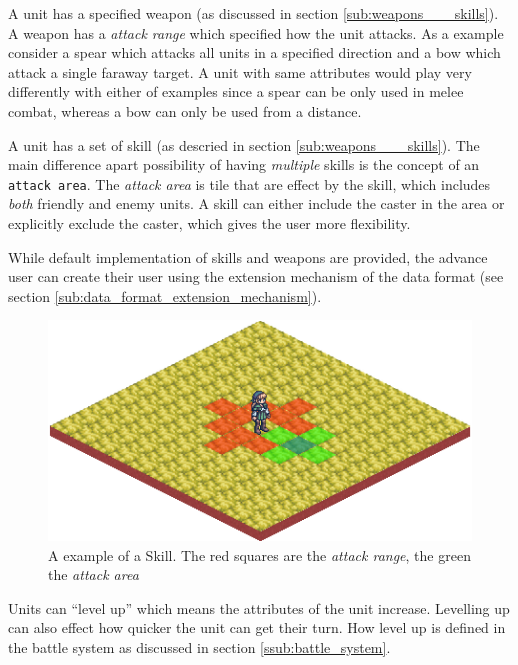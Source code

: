 A unit has a  specified weapon (as discussed in section \ref{sub:weapons___skills}).  A weapon has a \emph{attack range} which specified how the unit attacks.  As a example consider a spear which attacks all units in a specified direction and a bow which attack a single faraway target. A unit with same attributes would play very differently with either of examples since a spear can be only used in melee combat, whereas a bow can only be used from a distance.

A unit has a set of skill (as descried in section \ref{sub:weapons___skills}). The main difference apart possibility of having \emph{multiple} skills is the concept of an \texttt{attack area}.  The \emph{attack area} is tile that are effect by the skill, which includes \emph{both} friendly and enemy units. A skill can either include the caster in the area or explicitly exclude the caster, which gives the user more flexibility.

While default implementation of skills and weapons are provided, the advance user can create their user using the extension mechanism of the data format (see section \ref{sub:data_format_extension_mechanism}).

\begin{figure}[htbp]
	\centering
 		\includegraphics[scale=0.5]{figures/skill.png}
	\caption{A example of a Skill. The red squares are the \emph{attack range}, the green the \emph{attack area}}
	\label{fig:figures_engine_Skills}
\end{figure}

Units can ``level up'' which means the attributes  of the unit increase.  Levelling up can also effect how quicker the unit can get their turn. How level up is defined in the battle system as discussed in section \ref{ssub:battle_system}.


